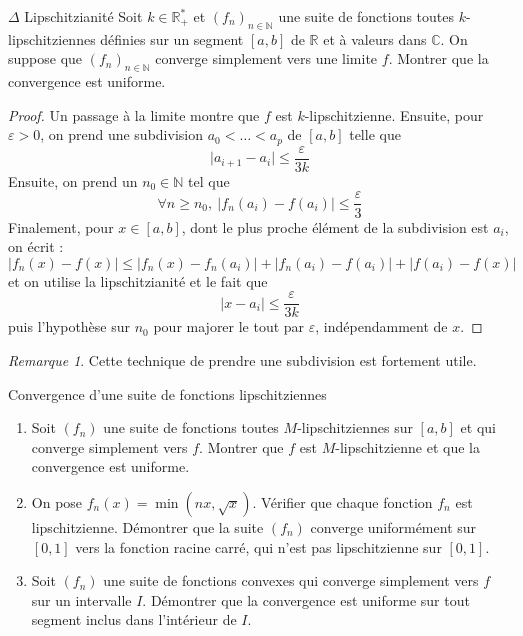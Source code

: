 \documentclass[french,a4paper]{article}
\newcommand{\N}{\mathbb{N}}
\newcommand{\R}{\mathbb{R}}
\newcommand{\C}{\mathbb{C}}
\newcommand{\st}{^*}
\theoremstyle{plain}
\theoremstyle{definition}
\theoremstyle{remark}
\newtheorem*{rmq}{Remarque}
\begin{document}
\begin{ex}{$\Delta$ Lipschitzianité}
	Soit $k\in\R_+\st$ et $(f_n)_{n\in\N}$ une suite de fonctions toutes $k$-lipschitziennes définies sur un segment $[a,b]$ de $\R$ et à valeurs dans $\C$. On suppose que $(f_n)_{n\in\N}$ converge simplement vers une limite $f$. Montrer que la convergence est uniforme.
\end{ex}
\begin{proof}
	Un passage à la limite montre que $f$ est $k$-lipschitzienne. Ensuite, pour $\varepsilon>0$, on prend une subdivision $a_0<\ldots<a_p$ de $[a,b]$ telle que $$\lvert a_{i+1}-a_i\rvert\leqslant\frac{\varepsilon}{3k}$$ Ensuite, on prend un $n_0\in\N$ tel que $$\forall n\geqslant n_0,\ \lvert f_n(a_i)-f(a_i)\rvert\leqslant\frac{\varepsilon}{3}$$ Finalement, pour $x\in[a,b]$, dont le plus proche élément de la subdivision est $a_i$, on écrit : $$\lvert f_n(x)-f(x)\rvert\leqslant\lvert f_n(x)-f_n(a_i)\rvert+\lvert f_n(a_i)-f(a_i)\rvert+\lvert f(a_i)-f(x)\rvert$$ et on utilise la lipschitzianité et le fait que $$\lvert x-a_i\rvert\leqslant \frac{\varepsilon}{3k}$$ puis l'hypothèse sur $n_0$ pour majorer le tout par $\varepsilon$, indépendamment de $x$.
\end{proof}
\begin{rmq}
	Cette technique de prendre une subdivision est fortement utile.
\end{rmq}

\begin{ex}[Châteaux]{Convergence d'une suite de fonctions lipschitziennes}
	\begin{enumerate}
		\item Soit $(f_n)$ une suite de fonctions toutes $M$-lipschitziennes sur $[a,b]$ et qui converge simplement vers $f$. Montrer que $f$ est $M$-lipschitzienne et que la convergence est uniforme.
		\item On pose $f_n(x)=\min(nx,\sqrt{x})$. Vérifier que chaque fonction $f_n$ est lipschitzienne. Démontrer que la suite $(f_n)$ converge uniformément sur $[0,1]$ vers la fonction racine carré, qui n'est pas lipschitzienne sur $[0,1]$.
		\item Soit $(f_n)$ une suite de fonctions convexes qui converge simplement vers $f$ sur un intervalle $I$. Démontrer que la convergence est uniforme sur tout segment inclus dans l'intérieur de $I$. 
	\end{enumerate}
\end{ex}
\end{document}

